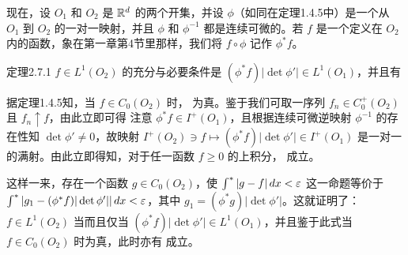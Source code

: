 现在，设 $O_1$ 和 $O_2$ 是 $\mathbb R^d$ 的两个开集，并设 $\phi$（如同在定理1.4.5中）是一个从 $O_1$ 到 $O_2$ 的一对一映射，并且 $\phi$ 和 $\phi^{-1}$ 都是连续可微的。若 $f$ 是一个定义在 $O_2$ 内的函数，象在第一章第4节里那样，我们将 $f\circ\phi$ 记作 $\phi^*f$。
\begin{statement}{定理}{2.7.1}
$f\in L^1(O_2)$ 的充分与必要条件是 $(\phi^*f)|\det\phi'|\in L^1(O_1)$，并且有
\end{statement}
\Proof 据定理1.4.5知，当 $f\in C_0(O_2)$ 时， 为真。鉴于我们可取一序列 $f_n\in C_0^+(O_2)$ 且 $f_n\uparrow f$，由此立即可得
注意 $\phi^*f\in I^+(O_1)$，且根据连续可微逆映射 $\phi^{-1}$ 的存在性知 $\det\phi'\ne0$，故映射 $I^+(O_2)\ni f\mapsto(\phi^*f)|\det\phi'|\in I^+(O_1)$ 是一对一的满射。由此立即得知，对于任一函数 $f\ge0$ 的上积分， 成立。

这样一来，存在一个函数 $g\in C_0(O_2)$，使 $\int^{*}|g-f|\,dx<\varepsilon$ 这一命题等价于 $\int^{*}|g_1-(\phi^*f)|\det\phi'||\,dx<\varepsilon$，其中 $g_1=(\phi^*g)|\det\phi'|$。这就证明了：$f\in L^1(O_2)$ 当而且仅当
$(\phi^*f)|\det\phi'|\in L^1(O_1)$，并且鉴于此式当 $f\in C_0(O_2)$ 时为真，此时亦有  成立。
